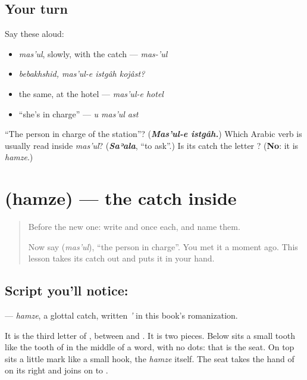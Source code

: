 \subsection*{Your turn}
Say these aloud:

\begin{itemize}
\raggedright
  \item \emph{mas'ul}, slowly, with the catch — \emph{mas-'ul}
  \item \emph{bebakhshid, mas'ul-e istgâh kojâst?}
  \item the same, at the hotel — \emph{mas'ul-e hotel}
  \item \textquotedblleft{}she's in charge\textquotedblright{} — \emph{u mas'ul ast}
\end{itemize}

\begin{tcolorbox}[breakable,colback=teal!4,colframe=teal!35!black,title={Before you move on}]
\textquotedblleft{}The person in charge of the station\textquotedblright{}? (\emph{\textbf{Mas'ul-e istgâh.}}) Which Arabic verb is usually read inside \emph{mas'ul}? (\emph{\textbf{Saʾala}}, \textquotedblleft{}to ask\textquotedblright{}.) Is its catch the letter ? (\textbf{No}: it is \emph{hamze}.)
\end{tcolorbox}
\section[\texorpdfstring{\fa{ئ} (hamze)}{ئ (hamze)}]{ (hamze) — the catch inside }

\label{lesson:FA-W295-hamze}



\begin{quote}
Before the new one: write  and  once each, and name them.

Now say \textbf{} (\emph{mas'ul}), \textquotedblleft{}the person in charge\textquotedblright{}. You met it a moment ago. This lesson takes its catch out and puts it in your hand.
\end{quote}

\subsection*{Script you'll notice: }
\textbf{} — \emph{hamze}, a glottal catch, written \emph{'} in this book's romanization.

It is the third letter of \textbf{}, between \textbf{} and \textbf{}. It is two pieces. Below sits a small tooth like the tooth of \textbf{} in the middle of a word, with no dots: that is the seat. On top sits a little mark like a small hook, the \emph{hamze} itself. The seat takes the hand of \textbf{} on its right and joins on to \textbf{}.

